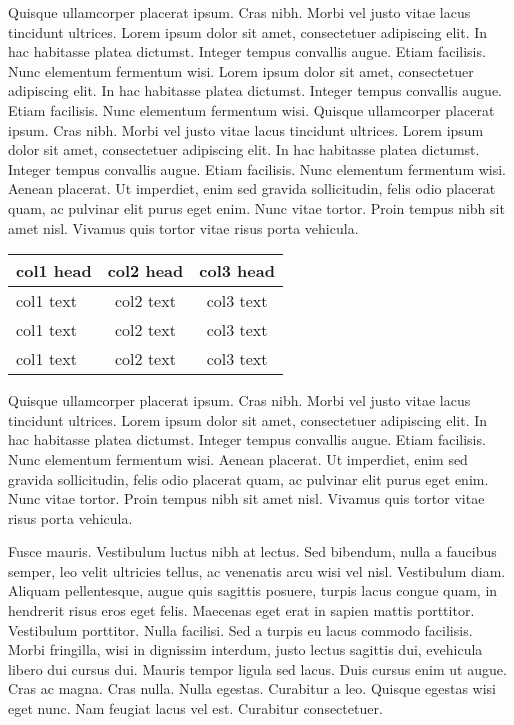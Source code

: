 \documentclass[AMA,STIX2COL,Linenumberson]{MRM}
\begin{document}
Quisque ullamcorper placerat ipsum. Cras nibh. Morbi vel justo vitae lacus tincidunt ultrices. Lorem ipsum dolor sit
amet, consectetuer adipiscing elit. In hac habitasse platea dictumst. Integer tempus convallis augue. Etiam facilisis.
Nunc elementum fermentum wisi. Lorem ipsum dolor sit
amet, consectetuer adipiscing elit. In hac habitasse platea dictumst. Integer tempus convallis augue. Etiam facilisis.
Nunc elementum fermentum wisi. Quisque ullamcorper placerat ipsum. Cras nibh. Morbi vel justo vitae lacus tincidunt ultrices. Lorem ipsum dolor sit
amet, consectetuer adipiscing elit. In hac habitasse platea dictumst. Integer tempus convallis augue. Etiam facilisis.
Nunc elementum fermentum wisi. Aenean placerat. Ut imperdiet, enim sed gravida sollicitudin, felis odio placerat
quam, ac pulvinar elit purus eget enim. Nunc vitae tortor. Proin tempus nibh sit amet nisl. Vivamus quis tortor
vitae risus porta vehicula.


\begin{center}
\begin{tabular}{@{\extracolsep\fill}lcc@{\extracolsep\fill}}%
\toprule
\textbf{col1 head} & \textbf{col2 head} & \textbf{col3 head} \\
\midrule
col1 text & col2 text & col3 text \\
col1 text & col2 text & col3 text \\
col1 text & col2 text & col3 text \\
\bottomrule
\end{tabular}
\end{center}


Quisque ullamcorper placerat ipsum. Cras nibh. Morbi vel justo vitae lacus tincidunt ultrices. Lorem ipsum dolor sit
amet, consectetuer adipiscing elit. In hac habitasse platea dictumst. Integer tempus convallis augue. Etiam facilisis.
Nunc elementum fermentum wisi. Aenean placerat. Ut imperdiet, enim sed gravida sollicitudin, felis odio placerat
quam, ac pulvinar elit purus eget enim. Nunc vitae tortor.  Proin tempus nibh sit amet nisl. Vivamus quis tortor
vitae risus porta vehicula.

Fusce mauris. Vestibulum luctus nibh at lectus. Sed bibendum, nulla a faucibus semper, leo velit ultricies tellus, ac
venenatis arcu wisi vel nisl. Vestibulum diam. Aliquam pellentesque, augue quis sagittis posuere, turpis lacus congue
quam, in hendrerit risus eros eget felis. Maecenas eget erat in sapien mattis porttitor. Vestibulum porttitor. Nulla
facilisi. Sed a turpis eu lacus commodo facilisis. Morbi fringilla, wisi in dignissim interdum, justo lectus sagittis dui, evehicula libero dui cursus dui. Mauris tempor ligula sed lacus. Duis cursus enim ut augue. Cras ac magna. Cras nulla.
Nulla egestas. Curabitur a leo. Quisque egestas wisi eget nunc. Nam feugiat lacus vel est. Curabitur consectetuer.
\end{document}
